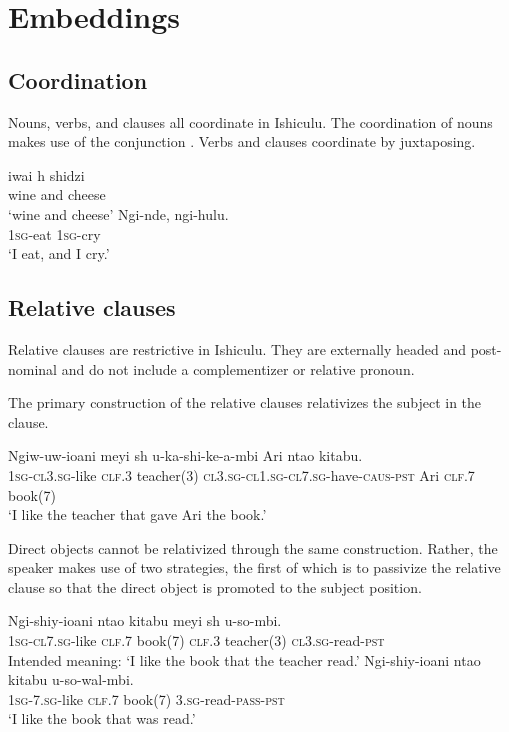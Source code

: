\chapter{Embeddings}

\section{Coordination}

Nouns, verbs, and clauses all coordinate in Ishiculu. The coordination of nouns makes use of the conjunction \textit{}. Verbs and clauses coordinate by juxtaposing.

\begin{exe}
\ex
\gll iwai {h\textramshorns} shidzi \\
wine and cheese \\
\trans `wine and cheese'
\ex
\gll Ngi-nde, ngi-hulu. \\
\textsc{1sg}-eat \textsc{1sg}-cry \\
\trans `I eat, and I cry.'
\end{exe}

\section{Relative clauses}

Relative clauses are restrictive in Ishiculu. They are externally headed and post-nominal and do not include a complementizer or relative pronoun.

The primary construction of the relative clauses relativizes the subject in the clause.

\begin{exe}
\ex
\gll Ngiw-uw-ioani meyi {sh\textramshorns} u-ka-shi-ke-\textbeltl a-mbi Ari nta\textbeltl o kitabu. \\
\textsc{1sg}-\textsc{cl3.sg}-like \textsc{clf.3} teacher(3) \textsc{cl3.sg}-\textsc{cl1.sg}-\textsc{cl7.sg}-have-\textsc{caus}-\textsc{pst} Ari \textsc{clf.7} book(7) \\
\trans `I like the teacher that gave Ari the book.'
\end{exe}

Direct objects cannot be relativized through the same construction. Rather, the speaker makes use of two strategies, the first of which is to passivize the relative clause so that the direct object is promoted to the subject position.

\begin{exe}
\ex
\gll * Ngi-shiy-ioani nta\textbeltl o kitabu meyi {sh\textramshorns} u-so-mbi. \\
{} \textsc{1sg}-\textsc{cl7.sg}-like \textsc{clf.7} book(7) \textsc{clf.3} teacher(3) \textsc{cl3.sg}-read-\textsc{pst} \\
\trans Intended meaning: `I like the book that the teacher read.'
\ex
\gll Ngi-shiy-ioani nta\textbeltl o kitabu u-so-wal\textramshorns-mbi. \\
\textsc{1sg}-\textsc{7.sg}-like \textsc{clf.7} book(7)  \textsc{3.sg}-read-\textsc{pass}-\textsc{pst} \\
\trans `I like the book that was read.'
\end{exe}

